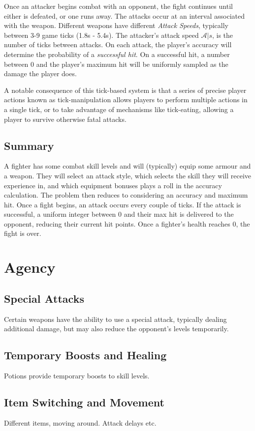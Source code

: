 		Once an attacker begins combat with an opponent, the fight continues until either is defeated, or one runs away. The attacks occur at an interval associated with the weapon. Different weapons have different \textit{Attack Speeds}, typically between 3-9 game ticks (1.8s - 5.4s). The attacker's attack speed $\mathcal{A}|s$, is the number of ticks between attacks. On each attack, the player's accuracy will determine the probability of a \textit{successful hit}. On a successful hit, a number between 0 and the player's maximum hit will be uniformly sampled as the damage the player does.

		A notable consequence of this tick-based system is that a series of precise player actions known as tick-manipulation allows players to perform multiple actions in a single tick, or to take advantage of mechanisms like tick-eating, allowing a player to survive otherwise fatal attacks.

	\subsection{Summary}
		A fighter has some combat skill levels and will (typically) equip some armour and a weapon. They will select an attack style, which selects the skill they will receive experience in, and which equipment bonuses plays a roll in the accuracy calculation. The problem then reduces to considering an accuracy and maximum hit. Once a fight begins, an attack occurs every couple of ticks. If the attack is successful, a uniform integer between 0 and their max hit is delivered to the opponent, reducing their current hit points. Once a fighter's health reaches 0, the fight is over.


\section{Agency}
	\subsection{Special Attacks}
		Certain weapons have the ability to use a special attack, typically dealing additional damage, but may also reduce the opponent's levels temporarily.

	\subsection{Temporary Boosts and Healing}
		Potions provide temporary boosts to skill levels.

	\subsection{Item Switching and Movement}
		Different items, moving around. Attack delays etc.
